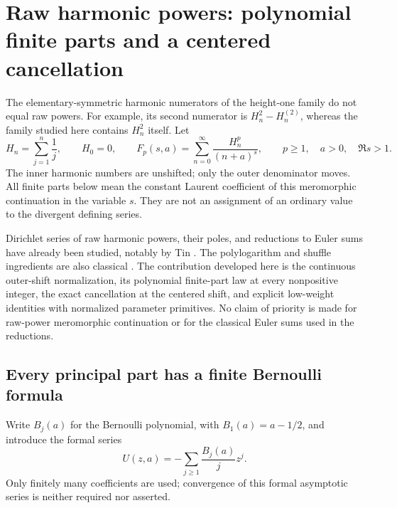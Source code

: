 \section{Raw harmonic powers: polynomial finite parts and a centered cancellation}
\label{hp:sec:main}

The elementary-symmetric harmonic numerators of the height-one family do
not equal raw powers. For example, its second numerator is
$H_n^2-H_n^{(2)}$, whereas the family studied here contains $H_n^2$ itself.
Let
\begin{equation}\label{hp:def:F}
 H_n=\sum_{j=1}^n\frac1j,\qquad H_0=0,\qquad
 F_p(s,a)=\sum_{n=0}^{\infty}\frac{H_n^p}{(n+a)^s},
 \qquad p\ge1,\quad a>0,\quad \Re s>1.
\end{equation}
The inner harmonic numbers are unshifted; only the outer denominator
moves. All finite parts below mean the constant Laurent coefficient of
this meromorphic continuation in the variable $s$. They are not an
assignment of an ordinary value to the divergent defining series.

Dirichlet series of raw harmonic powers, their poles, and reductions to
Euler sums have already been studied, notably by Tin
\cite{hp:Tin2025}. The polylogarithm and shuffle ingredients are also
classical \cite{hp:IKZ2006}. The contribution developed here is the
continuous outer-shift normalization, its polynomial finite-part law at
every nonpositive integer, the exact cancellation at the centered shift,
and explicit low-weight identities with normalized parameter primitives.
No claim of priority is made for raw-power meromorphic continuation or
for the classical Euler sums used in the reductions.

\subsection{Every principal part has a finite Bernoulli formula}

Write $B_j(a)$ for the Bernoulli polynomial, with $B_1(a)=a-1/2$, and
introduce the formal series
\begin{equation}\label{hp:def:U}
 U(z,a)=-\sum_{j\ge1}\frac{B_j(a)}jz^j.
\end{equation}
Only finitely many coefficients are used; convergence of this formal
asymptotic series is neither required nor asserted.

